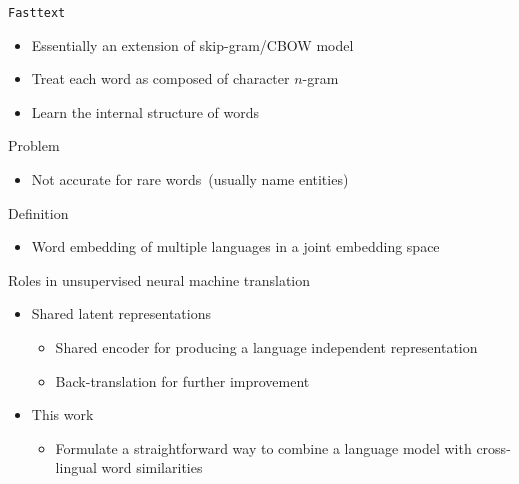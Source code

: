 \documentclass[11pt, a4paper, landscape]{article}
\begin{document}
	\NewPage
	\vfill
	\texttt{Fasttext}
	\begin{itemize}
		\item Essentially an extension of skip-gram/CBOW model
		\item Treat each word as composed of character ${n}$-gram
		\item Learn the internal structure of words\\
	\end{itemize}
	Problem
	\begin{itemize}
		\item Not accurate for rare words\ (usually name entities) 
	\end{itemize}
	
	
	\vfill
	\NewPage
	\vfill
	
	Definition
	\begin{itemize}
		\item Word embedding of multiple languages in a joint embedding space		\\
	\end{itemize}
	Roles in unsupervised neural machine translation 
	\begin{itemize}
		\item Shared latent representations
		\begin{itemize}
			\item Shared encoder for producing a language independent representation
			\item Back-translation for further improvement
		\end{itemize}
		\item This work
		\begin{itemize}
			\item Formulate a straightforward way to combine
			a language model with cross-lingual
			word similarities
		\end{itemize} 
		
		
	\end{itemize}
	\vfill
		
	\NewPage
	\vfill
	
\end{document}
